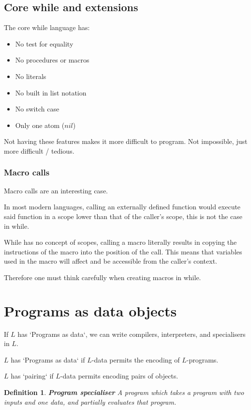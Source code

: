 \documentclass[a4paper, final]{article}
\newtheorem{definition}{Definition}
\begin{document}
\subsection{Core while and extensions}
The core while language has:
\begin{itemize}
	\item No test for equality
	\item No procedures or macros
	\item No literals
	\item No built in list notation
	\item No switch case
	\item Only one atom ($nil$)
\end{itemize}

Not having these features makes it more difficult to program.
Not impossible, just more difficult / tedious.

\subsubsection{Macro calls}
Macro calls are an interesting case.

In most modern languages, calling an externally defined function would execute said function
in a scope lower than that of the caller's scope, this is not the case in while.

While has no concept of scopes, calling a macro literally results in copying the instructions
of the macro into the position of the call. This means that variables used in the macro
will affect and be accessible from the caller's context.

Therefore one must think carefully when creating macros in while.

\section{Programs as data objects}
If $L$ has `Programs as data`, we can write compilers, interpreters, and specialisers in $L$.

$L$ has `Programs as data` if $L$-data permits the encoding of $L$-programs.

$L$ has `pairing` if $L$-data permits encoding pairs of objects.

\begin{definition}
	\textbf{Program specialiser}
	A program which takes a program with two inputs and one data, and partially evaluates that program.
\end{definition}
\end{document}
